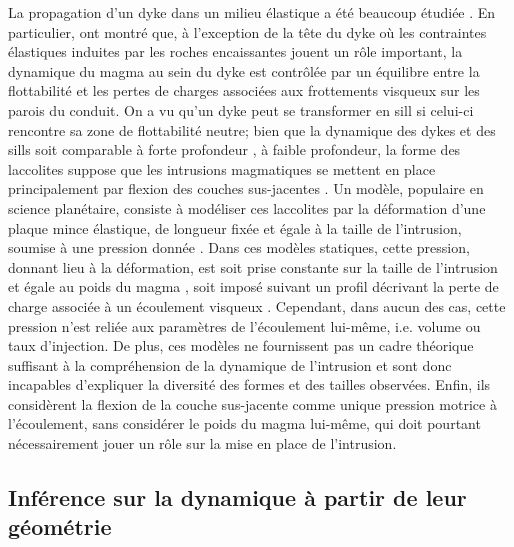 La  propagation d'un  dyke dans  un  milieu élastique  a été  beaucoup
étudiée    \citep{Lister:1991ut,Rubin:1995upa}.     En    particulier,
\citet{Lister:1991ut} ont montré que, à l'exception de la tête du dyke
où  les contraintes  élastiques induites  par les  roches encaissantes
jouent un  rôle important, la dynamique  du magma au sein  du dyke est
contrôlée  par un  équilibre entre  la flottabilité  et les  pertes de
charges associées aux frottements visqueux  sur les parois du conduit.
On a vu  qu'un dyke peut se transformer en  sill si celui-ci rencontre
sa zone de flottabilité neutre; bien que la dynamique des dykes et des
sills       soit       comparable       à       forte       profondeur
\citep{Lister:1991ut,Cruden:tg},  à faible  profondeur,  la forme  des
laccolites suppose que les intrusions  magmatiques se mettent en place
principalement     par     flexion    des     couches     sus-jacentes
\citep{Johnson:1973ho}.  Un  modèle, populaire en  science planétaire,
consiste à  modéliser ces laccolites  par la déformation  d'une plaque
mince  élastique,  de   longueur  fixée  et  égale  à   la  taille  de
l'intrusion,  soumise à  une  pression donnée  \citep{Pollard:1973ho}.
Dans  ces  modèles  statiques,  cette  pression,  donnant  lieu  à  la
déformation, est soit prise constante  sur la taille de l'intrusion et
égale             au             poids            du             magma
\citep{Pollard:1973ho,Wichman:1996bj,Jozwiak:2012dq},    soit   imposé
suivant  un  profil  décrivant  la  perte  de  charge  associée  à  un
écoulement visqueux \citep{Kerr:1998eo,Wohler:2009jj}. Cependant, dans
aucun  des  cas,  cette  pression   n’est  reliée  aux  paramètres  de
l’écoulement lui-même, i.e. volume ou  taux d’injection.  De plus, ces
modèles  ne  fournissent  pas  un   cadre  théorique  suffisant  à  la
compréhension de la  dynamique de l'intrusion et  sont donc incapables
d'expliquer la diversité  des formes et des  tailles observées. Enfin,
ils  considèrent la  flexion  de la  couche  sus-jacente comme  unique
pression motrice  à l'écoulement,  sans considérer  le poids  du magma
lui-même, qui doit  pourtant nécessairement jouer un rôle  sur la mise
en place de l'intrusion.

\subsection{Inférence sur la dynamique à partir de leur géométrie}

\label{sec:empl-dynam-des}


